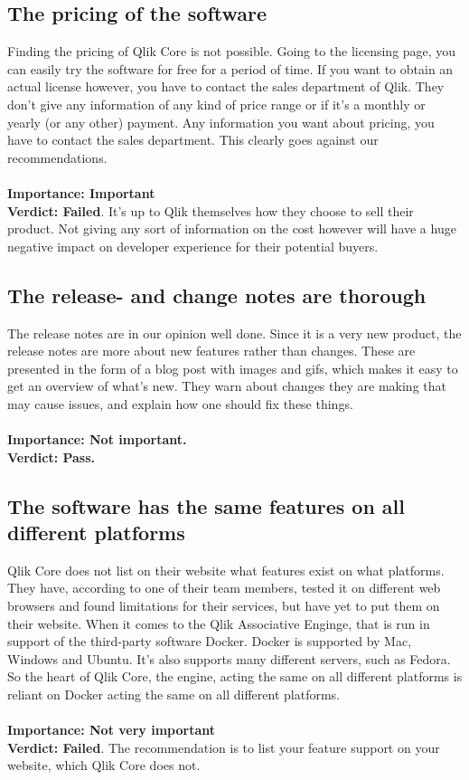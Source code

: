 \documentclass{cslthse-msc}
\begin{document}
    \subsection{The pricing of the software}
    Finding the pricing of Qlik Core is not possible. Going to the licensing page, you can easily try the software for free for a period of time. If you want to obtain an actual license however, you have to contact the sales department of Qlik. They don't give any information of any kind of price range or if it's a monthly or yearly (or any other) payment. Any information you want about pricing, you have to contact the sales department. This clearly goes against our recommendations.\\ \\
    \textbf{Importance: Important}\\
    \textbf{Verdict: Failed}. It's up to Qlik themselves how they choose to sell their product. Not giving any sort of information on the cost however will have a huge negative impact on developer experience for their potential buyers.
    \subsection{The release- and change notes are thorough}
    The release notes are in our opinion well done. Since it is a very new product, the release notes are more about new features rather than changes. These are presented in the form of a blog post with images and gifs, which makes it easy to get an overview of what's new. They warn about changes they are making that may cause issues, and explain how one should fix these things.\\ \\
    \textbf{Importance: Not important.}\\
    \textbf{Verdict: Pass.}
    \subsection{The software has the same features on all different platforms}\label{features}
    Qlik Core does not list on their website what features exist on what platforms. They have, according to one of their team members, tested it on different web browsers and found limitations for their services, but have yet to put them on their website. When it comes to the Qlik Associative Enginge, that is run in support of the third-party software Docker. Docker is supported by Mac, Windows and Ubuntu. It's also supports many different servers, such as Fedora. So the heart of Qlik Core, the engine, acting the same on all different platforms is reliant on Docker acting the same on all different platforms.\\\\
    \textbf{Importance: Not very important}\\
    \textbf{Verdict: Failed}. The recommendation is to list your feature support on your website, which Qlik Core does not.
\end{document}
